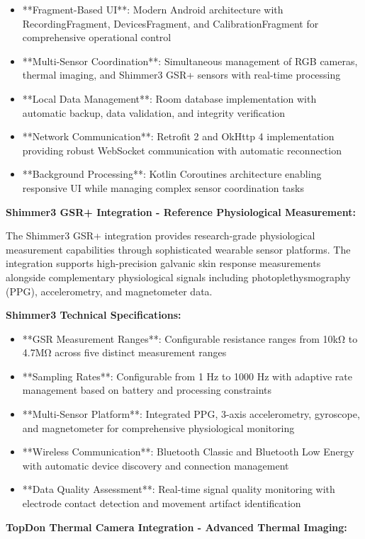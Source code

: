 \documentclass[12pt,a4paper]{report}
\begin{document}
\begin{itemize}
\item **Fragment-Based UI**: Modern Android architecture with RecordingFragment, DevicesFragment, and CalibrationFragment
  for comprehensive operational control
\item **Multi-Sensor Coordination**: Simultaneous management of RGB cameras, thermal imaging, and Shimmer3 GSR+ sensors with
  real-time processing
\item **Local Data Management**: Room database implementation with automatic backup, data validation, and integrity
  verification
\item **Network Communication**: Retrofit 2 and OkHttp 4 implementation providing robust WebSocket communication with
  automatic reconnection
\item **Background Processing**: Kotlin Coroutines architecture enabling responsive UI while managing complex sensor
  coordination tasks

\end{itemize}
\textbf{Shimmer3 GSR+ Integration - Reference Physiological Measurement:}

The Shimmer3 GSR+ integration provides research-grade physiological measurement capabilities through sophisticated
wearable sensor platforms. The integration supports high-precision galvanic skin response measurements alongside
complementary physiological signals including photoplethysmography (PPG), accelerometry, and magnetometer data.

\textbf{Shimmer3 Technical Specifications:}

\begin{itemize}
\item **GSR Measurement Ranges**: Configurable resistance ranges from 10kΩ to 4.7MΩ across five distinct measurement ranges
\item **Sampling Rates**: Configurable from 1 Hz to 1000 Hz with adaptive rate management based on battery and processing
  constraints
\item **Multi-Sensor Platform**: Integrated PPG, 3-axis accelerometry, gyroscope, and magnetometer for comprehensive
  physiological monitoring
\item **Wireless Communication**: Bluetooth Classic and Bluetooth Low Energy with automatic device discovery and connection
  management
\item **Data Quality Assessment**: Real-time signal quality monitoring with electrode contact detection and movement
  artifact identification

\end{itemize}
\textbf{TopDon Thermal Camera Integration - Advanced Thermal Imaging:}
\end{document}

